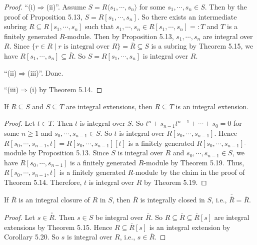 \begin{proof}
    ``(i)$\Rightarrow$(ii)''. Assume $S = R\langle s_1,\cdots,s_n \rangle$ for some $s_1,\cdots,s_n \in S$. Then by the proof of Proposition 5.13, $S = R[s_1,\cdots,s_n]$. So there exists an intermediate subring $R \subseteq R[s_1,\cdots,s_n]$ such that $s_1,\cdots,s_n \in R[s_1,\cdots,s_n] =: T$ and $T$ is a finitely generated $R$-module. Then by Proposition 5.13, $s_1,\cdots,s_n$ are integral over $R$. Since $\{r \in R \mid r \text{ is integral over }R\} = \overbar{R} \subseteq S$ is a subring by Theorem 5.15, we have $R[s_1,\cdots,s_n] \subseteq \overbar{R}$. So $S = R[s_1,\cdots,s_n]$ is integral over $R$. \par 
    ``(ii)$\Rightarrow$(iii)''. Done. \par 
    ``(iii)$\Rightarrow$(i) by Theorem 5.14.
\end{proof}


\begin{corollary}
    If $R \subseteq S$ and $S \subseteq T$ are integral extensions, then $R \subseteq T$ is an integral extension.
\end{corollary}

\begin{proof}
    Let $t \in T$. Then $t$ is integral over $S$. So $t^n + s_{n-1} t^{n-1} + \cdots + s_0 = 0$ for some $n \geq 1$ and $s_0,\cdots,s_{n-1} \in S$. So $t$ is integral over $R[s_0,\cdots,s_{n-1}]$. Hence $R[s_0,\cdots,s_{n-1},t] = R[s_0,\cdots,s_{n-1}][t]$ is a finitely generated $R[s_0,\cdots,s_{n-1}]$-module by Proposition 5.13. Since $S$ is integral over $R$ and $s_0,\cdots,s_{n-1} \in S$, we have $R[s_0,\cdots,s_{n-1}]$ is a finitely generated $R$-module by Theorem 5.19. Thus, $R[s_0,\cdots,s_{n-1},t]$ is a finitely generated $R$-module by the claim in the proof of Theorem 5.14. Therefore, $t$ is integral over $R$ by Theorem 5.19.
\end{proof}

\begin{corollary}
    If $\overbar{R}$ is an integral closure of $R$ in $S$, then $\overbar{R}$ is integrally closed in $S$, i.e., ${\overbar{\overbar{R}}} = \overbar{R}$.
\end{corollary}

\begin{proof}
    Let $s \in \overbar{\overbar{R}}$. Then $s \in S$ be integral over $\overbar{R}$. So $R \subseteq \overbar{R} \subseteq \overbar{R}[s]$ are integral extensions by Theorem 5.15. Hence $R \subseteq \overbar{R}[s]$ is an integral extension by Corollary 5.20. So $s$ is integral over $R$, i.e., $s \in \overbar{R}$.
\end{proof}

